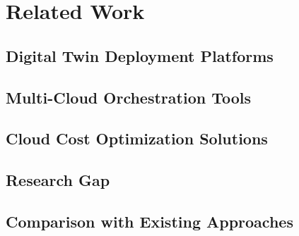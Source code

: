\chapter{\label{chap:relatedWork}Related Work}

%

\section{Digital Twin Deployment Platforms}

\section{Multi-Cloud Orchestration Tools}

\section{Cloud Cost Optimization Solutions}

\section{Research Gap}

\section{Comparison with Existing Approaches}
